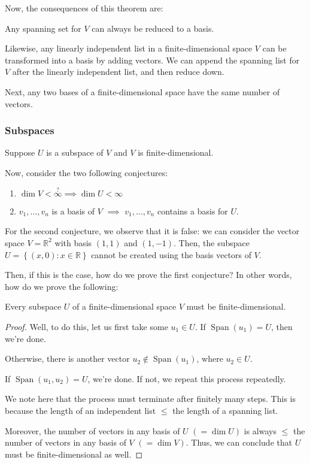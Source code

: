 \documentclass[openany]{book}
\newcommand{\RR}{\mathbb{R}}
\DeclareMathOperator*{\Span}{Span}
\begin{document}
	Now, the consequences of this theorem are:
	\begin{cor}
		Any spanning set for $V$ can always be reduced to a basis.
		
		Likewise, any linearly independent list in a finite-dimensional space $V$ can be transformed into a basis by adding vectors. We can append the spanning list for $V$ after the linearly independent list, and then reduce down.
	\end{cor}
	\begin{cor}
		Next, any two bases of a finite-dimensional space have the same number of vectors.
	\end{cor}
	
	\subsubsection{Subspaces}
	Suppose $U$ is a subspace of $V$ and $V$ is finite-dimensional.
	
	Now, consider the two following conjectures:
	\begin{enumerate}
		\item $\dim V < \stackrel{?}{\infty} \implies \dim U < \infty$
		\item $v_{1}, \ldots, v_{n}$ is a basis of $V$ $\implies$ $v_{1}, \ldots, v_{n}$ contains a basis for $U$.
	\end{enumerate}

	For the second conjecture, we observe that it is false: we can consider the vector space $V = \RR^{2}$ with basis $(1,1)$ and $(1,-1)$. Then, the subspace $U = \left\{  (x,0) : x \in \RR\right\}$ cannot be created using the basis vectors of $V$.
	
	Then, if this is the case, how do we prove the first conjecture? In other words, how do we prove the following:
	\begin{thm}
		Every subspace $U$ of a finite-dimensional space $V$ must be finite-dimensional.
	\end{thm}
	\begin{proof}
		Well, to do this, let us first take some $u_{1} \in U$. If $\Span (u_{1}) = U$, then we're done.
		
		Otherwise, there is another vector $u_{2} \not\in \Span(u_{1})$, where $u_{2} \in U$.
		
		If $\Span(u_{1}, u_{2}) = U$, we're done. If not, we repeat this process repeatedly.
		
		We note here that the process must terminate after finitely many steps. This is because the length of an independent list $\leq$ the length of a spanning list.
		
		Moreover, the number of vectors in any basis of $U$ $(= \dim U)$ is always $\leq$ the number of vectors in any basis of $V$ $(= \dim V)$. Thus, we can conclude that $U$ must be finite-dimensional as well.
	\end{proof}
\end{document}
